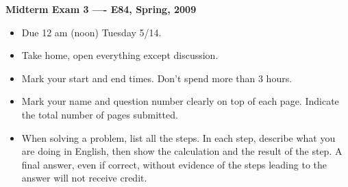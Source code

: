 \usepackage{html}

\begin{center}
{\Large \bf  Midterm Exam 3 ---- E84, Spring, 2009}
\end{center}

\begin{itemize}
\item Due 12 am (noon) Tuesday 5/14.
\item Take home, open everything except discussion.
\item Mark your start and end times. Don't spend more than 3 hours.
\item Mark your name and question number clearly on top of each page.
	Indicate the total number of pages submitted.
\item When solving a problem, list all the steps. In each step, describe 
	what you are doing in English, then show the calculation and the 
	result of the step. A final answer, even if correct, without 
	evidence of the steps leading to the answer will not receive credit.
\end{itemize}

